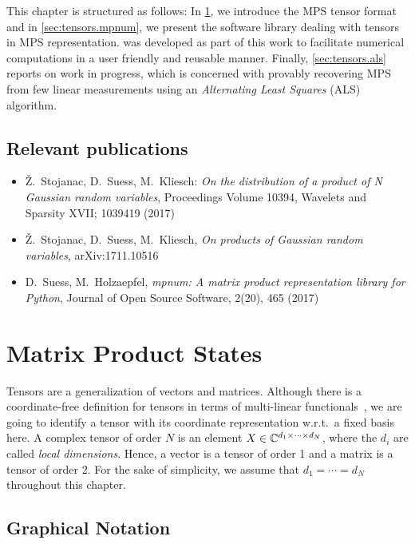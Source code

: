 This chapter is structured as follows:
In \cref{sec:tensors.mps}, we introduce the MPS tensor format and in \cref{sec:tensors.mpnum}, we present the software library \mpnum dealing with tensors in MPS representation.
\mpnum was developed as part of this work to facilitate numerical computations in a user friendly and reusable manner.
Finally, \cref{sec:tensors.als} reports on work in progress, which is concerned with provably recovering MPS from few linear measurements using an \emph{Alternating Least Squares} (ALS) algorithm.


\subsection*{Relevant publications}
\begin{itemize}
  \item Ž.\ Stojanac, D.\ Suess, M.\ Kliesch: \textit{On the distribution of a product of N Gaussian random variables}, Proceedings Volume 10394, Wavelets and Sparsity XVII; 1039419 (2017)
  \item Ž.\ Stojanac, D.\ Suess, M.\ Kliesch, \textit{On products of Gaussian random variables}, arXiv:1711.10516
  \item D.\ Suess, M.\ Holzaepfel, \textit{mpnum: A matrix product representation library for Python}, Journal of Open Source Software, 2(20), 465 (2017)
\end{itemize}
\section{Matrix Product States}%
\label{sec:tensors.mps}

Tensors are a generalization of vectors and matrices.
Although there is a coordinate-free definition for tensors in terms of multi-linear functionals~\cite{Browder_2012_Mathematical}, we are going to identify a tensor with its coordinate representation w.r.t.\ a fixed basis here.
A complex tensor of order $N$ is an element $X \in {\mathbb{C}}^{d_1 \times \cdots \times d_N}$, where the $d_i$ are called \emph{local dimensions}.
Hence, a vector is a tensor of order 1 and a matrix is a tensor of order 2.
For the sake of simplicity, we assume that $d_1 = \cdots = d_N$ throughout this chapter.



\subsection{Graphical Notation}%
\label{sub:mps.graphical_notation}

